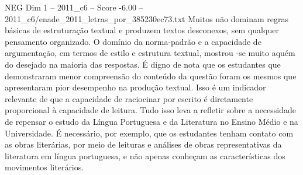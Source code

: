 \begin{textsample}{NEG Dim 1 – 2011\_c6 – Score -6.00 – 2011\_c6/enade\_2011\_letras\_por\_385230ec73.txt}
Muitos não dominam regras básicas de estruturação textual e produzem textos desconexos, sem qualquer pensamento organizado.
O domínio da norma-padrão e a capacidade de argumentação, em termos de estilo e estrutura textual, mostrou -se muito aquém do desejado na maioria das respostas.
É digno de nota que os estudantes que demonstraram menor compreensão do conteúdo da questão foram os mesmos que apresentaram pior desempenho na produção textual.
Isso é um indicador relevante de que a capacidade de raciocinar por escrito é diretamente proporcional à capacidade de leitura.
Tudo isso leva a refletir sobre a necessidade de repensar o estudo da Língua Portuguesa e da Literatura no Ensino Médio e na Universidade.
É necessário, por exemplo, que os estudantes tenham contato com as obras literárias, por meio de leituras e análises de obras representativas da literatura em língua portuguesa, e não apenas conheçam as características dos movimentos literários.

\end{textsample}
